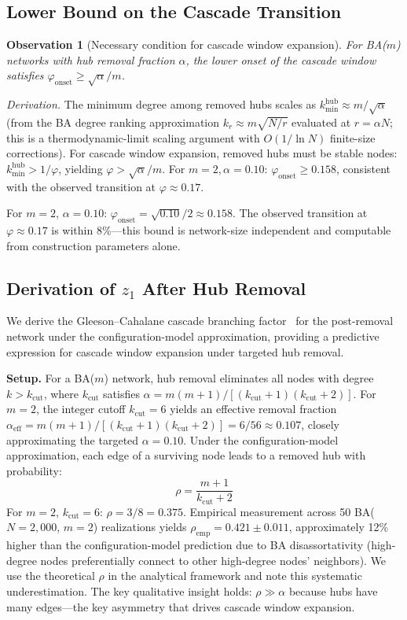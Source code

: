 \documentclass[aps,pre,twocolumn,superscriptaddress,showpacs]{revtex4-2}
\newcommand{\kcut}{k_{\text{cut}}}
\begin{document}
\subsection{Lower Bound on the Cascade Transition}

\textbf{Observation 1} (Necessary condition for cascade window expansion). \emph{For BA($m$) networks with hub removal fraction $\alpha$, the lower onset of the cascade window satisfies $\varphi_{\mathrm{onset}} \geq \sqrt{\alpha}/m$.}

\emph{Derivation.} The minimum degree among removed hubs scales as $k_{\min}^{\mathrm{hub}} \approx m/\sqrt{\alpha}$ (from the BA degree ranking approximation $k_r \approx m\sqrt{N/r}$ evaluated at $r = \alpha N$; this is a thermodynamic-limit scaling argument with $O(1/\ln N)$ finite-size corrections). For cascade window expansion, removed hubs must be stable nodes: $k_{\min}^{\mathrm{hub}} > 1/\varphi$, yielding $\varphi > \sqrt{\alpha}/m$. For $m=2, \alpha=0.10$: $\varphi_{\mathrm{onset}} \geq 0.158$, consistent with the observed transition at $\varphi \approx 0.17$.

For $m=2$, $\alpha=0.10$: $\varphi_{\mathrm{onset}} = \sqrt{0.10}/2 \approx 0.158$. The observed transition at $\varphi \approx 0.17$ is within 8\%---this bound is network-size independent and computable from construction parameters alone.

\subsection{Derivation of $z_1$ After Hub Removal}
\label{sec:z1}

We derive the Gleeson--Cahalane cascade branching factor~\cite{Gleeson2007} for the post-removal network under the configuration-model approximation, providing a predictive expression for cascade window expansion under targeted hub removal.

\textbf{Setup.} For a BA($m$) network, hub removal eliminates all nodes with degree $k > \kcut$, where $\kcut$ satisfies $\alpha = m(m+1)/[(\kcut+1)(\kcut+2)]$. For $m=2$, the integer cutoff $\kcut = 6$ yields an effective removal fraction $\alpha_{\mathrm{eff}} = m(m+1)/[(\kcut+1)(\kcut+2)] = 6/56 \approx 0.107$, closely approximating the targeted $\alpha = 0.10$. Under the configuration-model approximation, each edge of a surviving node leads to a removed hub with probability:
\begin{equation}
\rho = \frac{m+1}{\kcut + 2}
\label{eq:rho}
\end{equation}
For $m=2$, $\kcut=6$: $\rho = 3/8 = 0.375$. Empirical measurement across 50 BA($N=2{,}000$, $m=2$) realizations yields $\rho_{\mathrm{emp}} = 0.421 \pm 0.011$, approximately 12\% higher than the configuration-model prediction due to BA disassortativity (high-degree nodes preferentially connect to other high-degree nodes' neighbors). We use the theoretical $\rho$ in the analytical framework and note this systematic underestimation. The key qualitative insight holds: $\rho \gg \alpha$ because hubs have many edges---the key asymmetry that drives cascade window expansion.
\end{document}
